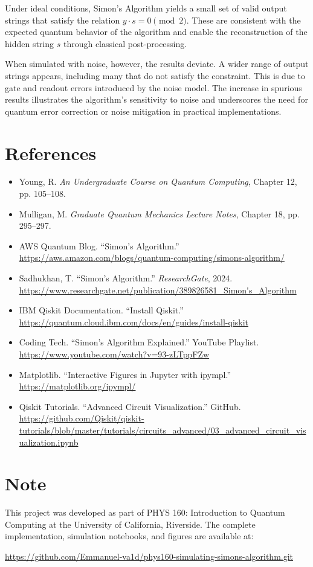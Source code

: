 \documentclass[12pt]{article}
\begin{document}
Under ideal conditions, Simon’s Algorithm yields a small set of valid output strings that satisfy the relation $y \cdot s = 0 \pmod{2}$. These are consistent with the expected quantum behavior of the algorithm and enable the reconstruction of the hidden string $s$ through classical post-processing.

When simulated with noise, however, the results deviate. A wider range of output strings appears, including many that do not satisfy the constraint. This is due to gate and readout errors introduced by the noise model. The increase in spurious results illustrates the algorithm’s sensitivity to noise and underscores the need for quantum error correction or noise mitigation in practical implementations.

\section*{References}
\begin{itemize}
  \item Young, R. \textit{An Undergraduate Course on Quantum Computing}, Chapter 12, pp. 105–108.
  \item Mulligan, M. \textit{Graduate Quantum Mechanics Lecture Notes}, Chapter 18, pp. 295–297.
  \item AWS Quantum Blog. “Simon’s Algorithm.” \url{https://aws.amazon.com/blogs/quantum-computing/simons-algorithm/}
  \item Sadhukhan, T. “Simon’s Algorithm.” \textit{ResearchGate}, 2024. \url{https://www.researchgate.net/publication/389826581_Simon's_Algorithm}
  \item IBM Qiskit Documentation. “Install Qiskit.” \url{https://quantum.cloud.ibm.com/docs/en/guides/install-qiskit}
  \item Coding Tech. “Simon’s Algorithm Explained.” YouTube Playlist. \url{https://www.youtube.com/watch?v=93-zLTppFZw}
  \item Matplotlib. “Interactive Figures in Jupyter with ipympl.” \url{https://matplotlib.org/ipympl/}
  \item Qiskit Tutorials. “Advanced Circuit Visualization.” GitHub. \url{https://github.com/Qiskit/qiskit-tutorials/blob/master/tutorials/circuits_advanced/03_advanced_circuit_visualization.ipynb}
\end{itemize}

\section*{Note}
This project was developed as part of PHYS 160: Introduction to Quantum Computing at the University of California, Riverside. The complete implementation, simulation notebooks, and figures are available at: 

\url{https://github.com/Emmanuel-va1d/phys160-simulating-simons-algorithm.git}
\end{document}
